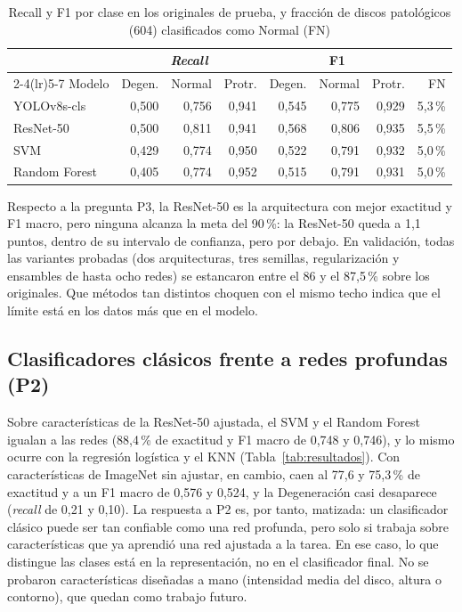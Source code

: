 \begin{table}[!htb]
\centering\footnotesize
\setlength{\tabcolsep}{3pt}
\caption{Recall y F1 por clase en los originales de prueba, y fracción de discos patológicos (604) clasificados como Normal (FN)}
\label{tab:porclase}
\begin{tabular}{lrrrrrrr}
\toprule
 & \multicolumn{3}{c}{\emph{Recall}} & \multicolumn{3}{c}{F1} & \\
\cmidrule(lr){2-4}\cmidrule(lr){5-7}
Modelo & Degen. & Normal & Protr. & Degen. & Normal & Protr. & FN \\
\midrule
YOLOv8s-cls   & 0,500 & 0,756 & 0,941 & 0,545 & 0,775 & 0,929 & 5,3\,\% \\
ResNet-50     & 0,500 & 0,811 & 0,941 & 0,568 & 0,806 & 0,935 & 5,5\,\% \\
SVM           & 0,429 & 0,774 & 0,950 & 0,522 & 0,791 & 0,932 & 5,0\,\% \\
Random Forest & 0,405 & 0,774 & 0,952 & 0,515 & 0,791 & 0,931 & 5,0\,\% \\
\bottomrule
\end{tabular}
\end{table}

Respecto a la pregunta P3, la ResNet-50 es la arquitectura con mejor exactitud y F1 macro, pero ninguna alcanza la meta del 90\,\%: la ResNet-50 queda a 1,1 puntos, dentro de su intervalo de confianza, pero por debajo. En validación, todas las variantes probadas (dos arquitecturas, tres semillas, regularización y ensambles de hasta ocho redes) se estancaron entre el 86 y el 87,5\,\% sobre los originales. Que métodos tan distintos choquen con el mismo techo indica que el límite está en los datos más que en el modelo.

\subsection{Clasificadores clásicos frente a redes profundas (P2)}
\label{sec:res_p2}
Sobre características de la ResNet-50 ajustada, el SVM y el Random Forest igualan a las redes (88,4\,\% de exactitud y F1 macro de 0,748 y 0,746), y lo mismo ocurre con la regresión logística y el KNN (Tabla~\ref{tab:resultados}). Con características de ImageNet sin ajustar, en cambio, caen al 77,6 y 75,3\,\% de exactitud y a un F1 macro de 0,576 y 0,524, y la Degeneración casi desaparece (\emph{recall} de 0,21 y 0,10). La respuesta a P2 es, por tanto, matizada: un clasificador clásico puede ser tan confiable como una red profunda, pero solo si trabaja sobre características que ya aprendió una red ajustada a la tarea. En ese caso, lo que distingue las clases está en la representación, no en el clasificador final. No se probaron características diseñadas a mano (intensidad media del disco, altura o contorno), que quedan como trabajo futuro.


